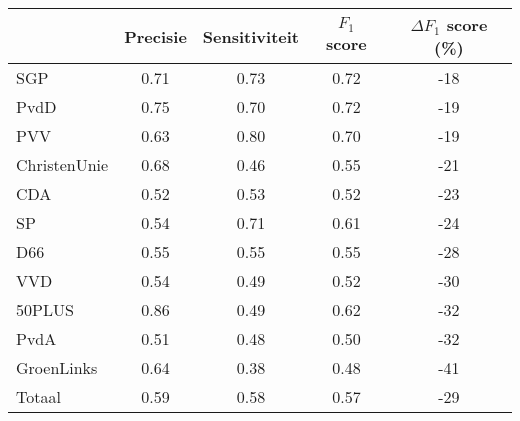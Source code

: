 \begin{tabular}{lcccc}
\toprule
{} &  Precisie &  Sensitiviteit &  $F_1$ score &  $\Delta F_1$ score (\%) \\
\midrule
SGP          &       0.71 &    0.73 &      0.72 & -18 \\
PvdD         &       0.75 &    0.70 &      0.72 & -19 \\
PVV          &       0.63 &    0.80 &      0.70 & -19 \\
ChristenUnie &       0.68 &    0.46 &      0.55 & -21 \\
CDA          &       0.52 &    0.53 &      0.52 & -23 \\
SP           &       0.54 &    0.71 &      0.61 & -24 \\
D66          &       0.55 &    0.55 &      0.55 & -28 \\
VVD          &       0.54 &    0.49 &      0.52 & -30 \\
50PLUS       &       0.86 &    0.49 &      0.62 & -32 \\
PvdA         &       0.51 &    0.48 &      0.50 & -32 \\
GroenLinks   &       0.64 &    0.38 &      0.48 & -41 \\
\midrule
Totaal       &       0.59 &    0.58 &      0.57 &        -29 \\
\bottomrule
\end{tabular}
